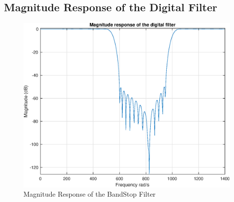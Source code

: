 \documentclass[11pt]{article}
\begin{document}
\subsection{Magnitude Response of the Digital Filter}
\begin{figure}[H]
    \centering
    \includegraphics[scale=0.6]{mag.eps} 
    \caption{Magnitude Response of the BandStop Filter}
    \label{fig:kaiser}
\end{figure}
\end{document}
